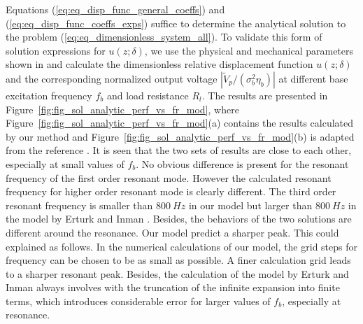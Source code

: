 \documentclass{article}
\begin{document}
Equations (\ref{eq:eq_disp_func_general_coeffs}) and (\ref{eq:eq_disp_func_coeffs_exps}) suffice to determine the analytical solution to the problem (\ref{eq:eq_dimensionless_system_all}). To validate this form of solution expressions for $u(z;\delta)$, we use the physical and mechanical parameters shown in \cite{erturk2008distributed} and calculate the dimensionless relative displacement function $u(z;\delta)$ and the corresponding normalized output voltage $| \tilde{V}_p/(\sigma_b^2 \eta_b) |$ at different base excitation frequency $f_b$ and load resistance $R_l$. The results are presented in Figure~\ref{fig:fig_sol_analytic_perf_vs_fr_mod}, where Figure~\ref{fig:fig_sol_analytic_perf_vs_fr_mod}(a) contains the results calculated by our method and Figure~\ref{fig:fig_sol_analytic_perf_vs_fr_mod}(b) is adapted from the reference \cite{erturk2008distributed}. It is seen that the two sets of results are close to each other, especially at small values of $f_b$. No obvious difference is present for the resonant frequency of the first order resonant mode. However the calculated resonant frequency for higher order resonant mode is clearly different. The third order resonant frequency is smaller than $800\ Hz$ in our model but larger than $800\ Hz$ in the model by Erturk and Inman \cite{erturk2008distributed}. Besides, the behaviors of the two solutions are different around the resonance. Our model predict a sharper peak. This could explained as follows. In the numerical calculations of our model, the grid steps for frequency can be chosen to be as small as possible. A finer calculation grid leads to a sharper resonant peak. Besides, the calculation of the model by Erturk and Inman \cite{erturk2008distributed} always involves with the truncation of the infinite expansion into finite terms, which introduces considerable error for larger values of $f_b$, especially at resonance. 
\end{document}
